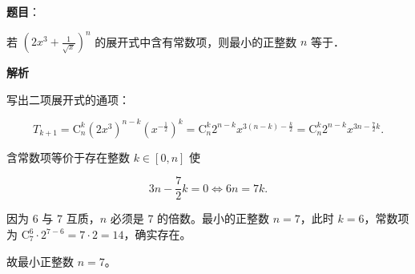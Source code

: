 \begin{answer}

\textbf{题目}：

若 $\left(2x^3+\frac{1}{\sqrt x}\right)^n$ 的展开式中含有常数项，则最小的正整数 $n$ 等于\gkblank{}．

\textbf{解析}

写出二项展开式的通项：

\nopagebreak[4]
\[T_{k+1}=\mathrm C_n^k(2x^3)^{n-k}\left(x^{-\frac12}\right)^k=\mathrm C_n^k2^{n-k}x^{3(n-k)-\frac k2}=\mathrm C_n^k2^{n-k}x^{3n-\frac72k}.\]

含常数项等价于存在整数 $k\in[0,n]$ 使

\nopagebreak[4]
\[3n-\frac72k=0\iff 6n=7k.\]

因为 $6$ 与 $7$ 互质，$n$ 必须是 $7$ 的倍数。最小的正整数 $n=7$，此时 $k=6$，常数项为 $\mathrm C_7^6\cdot2^{7-6}=7\cdot2=14$，确实存在。

故最小正整数 $n=7$。


\end{answer}
